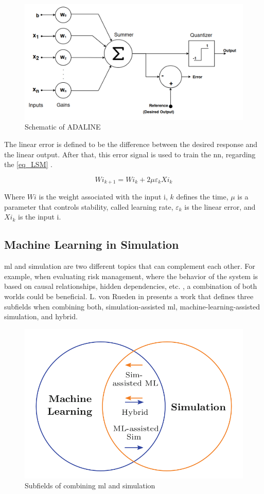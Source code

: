 \begin{figure}[H]
	\centering
 	\includegraphics[width=0.8\linewidth]{Images/AdalineSquematic.png}
 	\caption{Schematic of ADALINE \cite{widrow1960adaptive}}
	 \label{fig_AdalineSquematic}
\end{figure}

The linear error is defined to be the difference between the desired response and the linear output. After that, this error signal is used 
to train the \gls{nn}, regarding the \autoref{eq_LSM} \cite{widrow1995perceptrons}.

\begin{equation}
    Wi_{k+1} = Wi_{k} + 2 \mu \varepsilon_{k}Xi_{k}
    \label{eq_LSM}
\end{equation}

Where $Wi$ is the weight associated with the input i, $k$ defines the time, $\mu$ is a parameter that controls stability, called learning 
rate, $\varepsilon_{k}$ is the linear error, and $Xi_{k}$ is the input i. 

\subsection{Machine Learning in Simulation}

\gls{ml} and simulation are two different topics that can complement each other. For example, when evaluating risk management, where the 
behavior of the system is based on causal relationships, hidden dependencies, etc. \cite{mitchell2017natural}, a combination of both worlds 
could be beneficial.  L. von Rueden in \cite{von2020combining} presents a work that defines three subfields when combining both, 
simulation-assisted \gls{ml}, machine-learning-assisted simulation, and hybrid.

\begin{figure}[H]
	\centering
 	\includegraphics[width=0.5\linewidth]{Images/SimAndML.png}
 	\caption{Subfields of combining \gls{ml} and simulation \cite{von2020combining}}
\end{figure}


